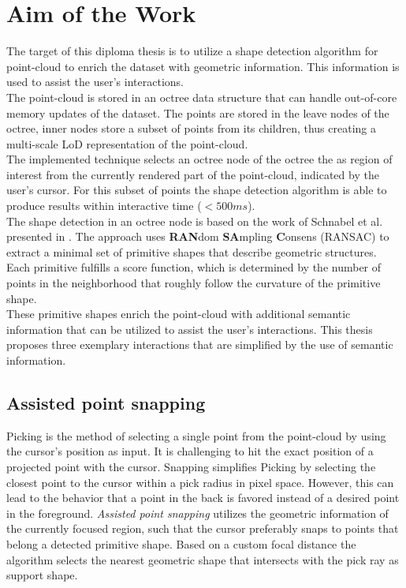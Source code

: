 \section{Aim of the Work}
\label{sec:aim}
The target of this diploma thesis is to utilize a shape detection algorithm for point-cloud to enrich the dataset with geometric information. This information is used to assist the user's interactions.
\\
The point-cloud is stored in an octree data structure that can handle out-of-core memory updates of the dataset. The points are stored in the leave nodes of the octree, inner nodes store a subset of points from its children, thus creating a multi-scale LoD representation of the point-cloud.
\\
The implemented technique selects an octree node of the octree the as region of interest from the currently rendered part of the point-cloud, indicated by the user's cursor. For this subset of points the shape detection algorithm is able to produce results within interactive time ($<500ms$).
\\
The shape detection in an octree node is based on the work of Schnabel et al. presented in \cite{schnabel-2007-efficient}. The approach uses \textbf{RAN}dom \textbf{SA}mpling \textbf{C}onsens (RANSAC) \cite{fischler1981random} to extract a minimal set of primitive shapes that describe geometric structures. Each primitive fulfills a score function, which is determined by the number of points in the neighborhood that roughly follow the curvature of the primitive shape.
\\
These primitive shapes enrich the point-cloud with additional semantic information that can be utilized to assist the user's interactions. This thesis proposes three exemplary interactions that are simplified by the use of semantic information. 
\\
\subsection{Assisted point snapping}
Picking is the method of selecting a single point from the point-cloud by using the cursor's position as input. It is challenging to hit the exact position of a projected point with the cursor. Snapping simplifies Picking by selecting the closest point to the cursor within a pick radius in pixel space. However, this can lead to the behavior that a point in the back is favored instead of a desired point in the foreground. 
\textit{Assisted point snapping} utilizes the geometric information of the currently focused region, such that the cursor preferably snaps to points that belong a detected primitive shape. Based on a custom focal distance the algorithm selects the nearest geometric shape that intersects with the pick ray as support shape. 
\\
